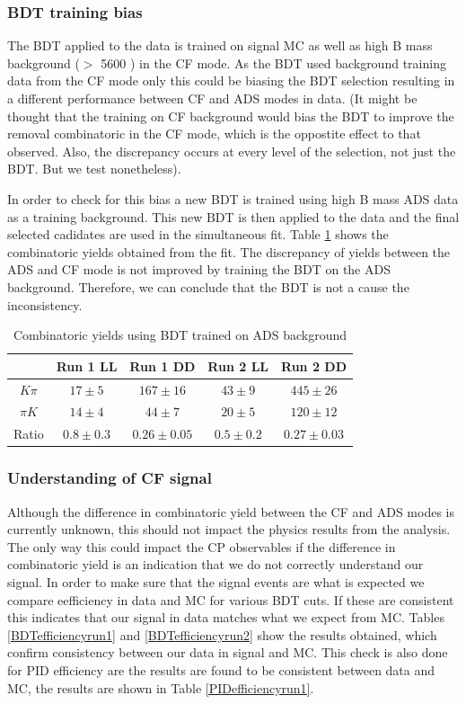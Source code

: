 \subsubsection{BDT training bias}

The BDT applied to the data is trained on signal MC as well as high B mass background ($>$ 5600 \mev) in the CF mode. As the BDT used background training data from the CF mode only this could be biasing the BDT selection resulting in a different performance between CF and ADS modes in data. (It might be thought that the training on CF background would bias the BDT to improve the removal combinatoric in the CF mode, which is the oppostite effect to that observed. Also, the discrepancy occurs at every level of the selection, not just the BDT. But we test nonetheless).

In order to check for this bias a new BDT is trained using high B mass ADS data as a training background. This new BDT is then applied to the data and the final selected cadidates are used in the simultaneous fit. Table \ref{adsbdt} shows the combinatoric yields obtained from the fit. The discrepancy of yields between the ADS and CF mode is not improved by training the BDT on the ADS background. Therefore, we can conclude that the BDT is not a cause the inconsistency.

\begin{table}[!h]
\centering
\begin{tabular}{c|cccc}
& Run 1 LL & Run 1 DD & Run 2 LL & Run 2 DD \\
\hline
$K\pi$ & $17 \pm 5$ & $167 \pm 16$ & $43 \pm 9$ & $445 \pm 26$ \\
$\pi K$ & $14 \pm 4$ & $44 \pm 7$ & $20 \pm 5$ & $120 \pm 12$ \\
\hline
Ratio & $0.8 \pm 0.3$ & $0.26 \pm 0.05$ & $0.5 \pm 0.2$ & $0.27 \pm 0.03$ \\
\hline
\end{tabular}
\caption{Combinatoric yields using BDT trained on ADS background}
\label{adsbdt}
\end{table}

\subsubsection{Understanding of CF signal}

Although the difference in combinatoric yield between the CF and ADS modes is currently unknown, this should not impact the physics results from the analysis. The only way this could impact the CP observables if the difference in combinatoric yield is an indication that we do not correctly understand our signal. In order to make sure that the signal events are what is expected we compare eefficiency in data and MC for various BDT cuts. If these are consistent this indicates that our signal in data matches what we expect from MC. Tables \ref{BDTefficiencyrun1} and \ref{BDTefficiencyrun2} show the results obtained, which confirm consistency between our data in signal and MC. This check is also done for PID efficiency are the results are found to be consistent between data and MC, the results are shown in Table \ref{PIDefficiencyrun1}.

